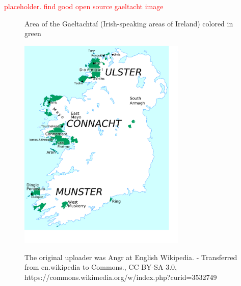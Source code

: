 \documentclass[thesis]{cluu}
\newcommand{\todo}[1]{\textcolor{red}{#1}}
\begin{document}
\todo{placeholder. find good open source gaeltacht image}
\begin{figure}[h]
    \caption{Area of the Gaeltachtaí (Irish-speaking areas of Ireland) colored in green}
    \includegraphics[width=8cm]{Gaeltachtai_le_hainmneacha2.png}
    \centering
    \label{fig:gaeltacht}
    \caption{The original uploader was Angr at English Wikipedia. - Transferred from en.wikipedia to Commons., CC BY-SA 3.0, https://commons.wikimedia.org/w/index.php?curid=3532749}
\end{figure} 
\end{document}
